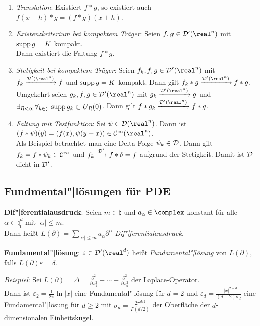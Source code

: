 \begin{enumerate}
    \item
    \emph{Translation}:
    Existiert $f \ast g$, so existiert auch
    $f(x + h) \ast g = (f \ast g)(x + h)$.
    
    \item
    \emph{Existenzkriterium bei kompaktem Träger}:
    Seien $f, g \in \D'(\real^n)$ mit $\operatorname{supp} g = K$ kompakt.\\
    Dann existiert die Faltung $f \ast g$.
    
    \item
    \emph{Stetigkeit bei kompaktem Träger}:
    Seien $f_k, f, g \in \D'(\real^n)$ mit $f_k \xrightarrow{\D'(\real^n)} f$
    und $\operatorname{supp} g = K$ kompakt.
    Dann gilt $f_k \ast g \xrightarrow{\D'(\real^n)} f \ast g$.
    Umgekehrt seien $g_k, f, g \in \D'(\real^n)$ mit
    $g_k \xrightarrow{\D'(\real^n)} g$
    und $\exists_{R < \infty} \forall_{k \in \natural}\;
    \operatorname{supp} g_k \subset U_R(0)$.
    Dann gilt $f \ast g_k \xrightarrow{\D'(\real^n)} f \ast g$.
    
    \item
    \emph{Faltung mit Testfunktion}:
    Sei $\psi \in \D(\real^n)$.
    Dann ist $(f \ast \psi)(y) = (f(x), \psi(y - x)) \in \C^\infty(\real^n)$.\\
    Als Beispiel betrachtet man eine Delta-Folge $\psi_k \in \mathcal{D}$.
    Dann gilt $f_k = f \ast \psi_k \in \mathcal{C}^\infty$ und
    $f_k \xrightarrow{\mathcal{D}'} f \ast \delta = f$ aufgrund der Stetigkeit.
    Damit ist $\mathcal{D}$ dicht in $\mathcal{D}'$.
\end{enumerate}

\subsection{%
    Fundmental"|lösungen für PDE%
}

\textbf{Dif"|ferentialausdruck}:
Seien $m \in \natural$ und $a_\alpha \in \complex$ konstant für alle
$\alpha \in \natural_0^d$ mit $|\alpha| \le m$.\\
Dann heißt $L(\partial) = \sum_{|\alpha| \le m} a_\alpha \partial^\alpha$
\emph{Dif"|ferentialausdruck}.

\textbf{Fundamental"|lösung}:
$\varepsilon \in \D'(\real^d)$ heißt \emph{Fundamental"|lösung} von
$L(\partial)$, falls $L(\partial) \varepsilon = \delta$.

\emph{Beispiel}: Sei $L(\partial) = \Delta =
\frac{\partial^2}{\partial x_1^2} + \dotsb +
\frac{\partial^2}{\partial x_d^2}$ der Laplace-Operator.\\
Dann ist $\varepsilon_2 = \frac{1}{2\pi} \ln |x|$
eine Fundamental"|lösung für $d = 2$ und
$\varepsilon_d = \frac{-|x|^{2-d}}{(d - 2)\sigma_d}$
eine Fundamental"|lösung für $d \ge 2$ mit
$\sigma_d = \frac{2\pi^{d/2}}{\Gamma(d/2)}$
der Oberfläche der $d$-dimensionalen Einheitskugel.

